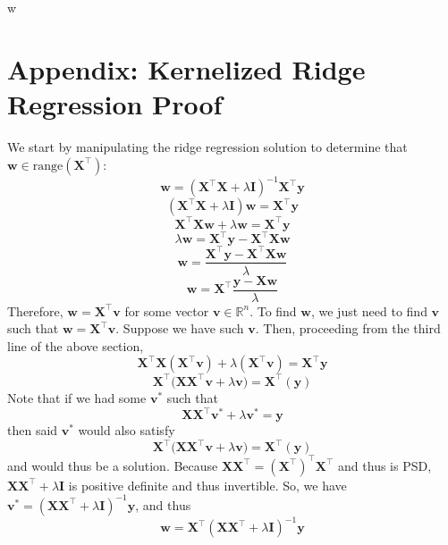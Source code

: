 w\documentclass{article}
\begin{document}
\section*{Appendix: Kernelized Ridge Regression Proof}
We start by manipulating the ridge regression solution to determine that $\mathbf{w} \in \text{range}(\mathbf{X^{\top}})$: $$ \mathbf{w} = (\mathbf{X^{\top}X} + \lambda\mathbf{I})^{-1}\mathbf{X^{\top}y}$$ $$(\mathbf{X^{\top}X} + \lambda\mathbf{I})\mathbf{w} = \mathbf{X^{\top}y}$$ $$\mathbf{X^{\top}Xw} + \lambda\mathbf{w} = \mathbf{X^{\top}y}$$ $$\lambda\mathbf{w} = \mathbf{X^{\top}y - X^{\top}Xw}$$ $$\mathbf{w} = \frac{\mathbf{X^{\top}y - X^{\top}Xw}}{\lambda}$$ $$\mathbf{w} = \mathbf{X^{\top}}\frac{\mathbf{y - Xw}}{\lambda}$$ Therefore, $\mathbf{w} = \mathbf{X^{\top}v}$ for some vector $\mathbf{v} \in \mathbb{R}^n$. To find $\mathbf{w}$, we just need to find $\mathbf{v}$ such that $\mathbf{w = X^{\top}v}$. Suppose we have such $\mathbf{v}$. Then, proceeding from the third line of the above section, $$\mathbf{X^{\top}X(X^{\top}v)} + \lambda(\mathbf{X^{\top}v}) = \mathbf{X^{\top}y}$$ $$\mathbf{X^{\top}(XX^{\top}v} + \lambda\mathbf{v) = X^{\top}(y)}$$ Note that if we had some $\mathbf{v^*}$ such that $$\mathbf{XX^{\top}v^*} + \lambda\mathbf{v^* = y}$$ then said $\mathbf{v^*}$ would also satisfy $$\mathbf{X^{\top}(XX^{\top}v} + \lambda\mathbf{v) = X^{\top}(y)}$$ and would thus be a solution. Because $\mathbf{XX^{\top}} = \mathbf{(X^{\top})^{\top}X^{\top}}$ and thus is PSD, $\mathbf{XX^{\top}} + \lambda\mathbf{I}$ is positive definite and thus invertible. So, we have $\mathbf{v^*} = (\mathbf{XX^{\top}} + \lambda\mathbf{I})^{-1}\mathbf{y}$, and thus $$\mathbf{w} = \mathbf{X^{\top}}(\mathbf{XX^{\top}} + \lambda\mathbf{I})^{-1}\mathbf{y}$$
\end{document}
